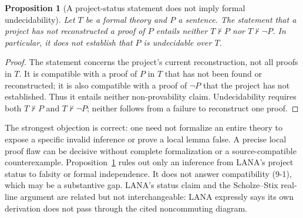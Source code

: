 \documentclass[11pt]{article}
\newtheorem{proposition}[theorem]{Proposition}
\begin{document}
\begin{proposition}[A project-status statement does not imply formal undecidability]\label{prop:undecidability}
Let $T$ be a formal theory and $P$ a sentence. The statement that a project has not reconstructed a proof of $P$ entails neither $T\nvdash P$ nor $T\nvdash\neg P$. In particular, it does not establish that $P$ is undecidable over $T$.
\end{proposition}
\begin{proof}
The statement concerns the project's current reconstruction, not all proofs in $T$. It is compatible with a proof of $P$ in $T$ that has not been found or reconstructed; it is also compatible with a proof of $\neg P$ that the project has not established. Thus it entails neither non-provability claim. Undecidability requires both $T\nvdash P$ and $T\nvdash\neg P$; neither follows from a failure to reconstruct one proof.
\end{proof}

The strongest objection is correct: one need not formalize an entire theory to expose a specific invalid inference or prove a local lemma false. A precise local proof flaw can be decisive without complete formalization or a source-compatible counterexample. Proposition~\ref{prop:undecidability} rules out only an inference from LANA's project status to falsity or formal independence. It does not answer compatibility (9-1), which may be a substantive gap. LANA's status claim and the Scholze--Stix real-line argument are related but not interchangeable: LANA expressly says its own derivation does not pass through the cited noncommuting diagram.
\end{document}
